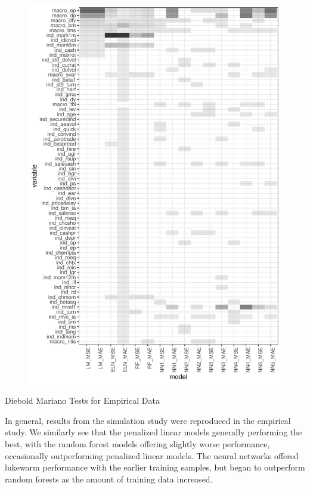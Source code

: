 \documentclass[a4paper, table]{article}
\begin{document}
\begin{figure}
	\includegraphics{empirical_sample_all_vi.pdf}
\end{figure}
	

\begin{table}
	\caption{Diebold Mariano Tests for Empirical Data}
\end{table}

In general, results from the simulation study were reproduced in the empirical study. We similarly see that the penalized linear models generally performing the best, with the random forest models offering slightly worse performance, occasionally outperforming penalized linear models. The neural networks offered lukewarm performance with the earlier training samples, but began to outperform random forests as the amount of training data increased.
\end{document}
